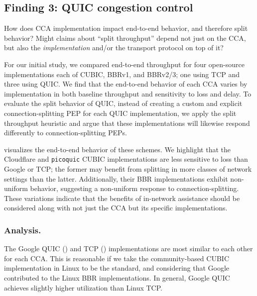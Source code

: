 \subsection{Finding 3: QUIC congestion control}
\label{sec:splitting:results:finding3}




How does CCA implementation impact end-to-end behavior, and therefore split
behavior? Might claims about ``split throughput'' depend not just on the CCA,
but also the \textit{implementation} and/or the transport protocol
on top of it?

For our initial study, we compared end-to-end throughput for four open-source
implementations each of CUBIC, BBRv1, and BBRv2/3; one using TCP and three
using QUIC. We find that the end-to-end behavior of each CCA varies by
implementation in both baseline throughput and sensitivity to loss and delay.
To evaluate the split behavior of QUIC, instead of creating a custom and
explicit connection-splitting PEP for each QUIC implementation, we apply the
split throughput heuristic and argue that these implementations
will likewise respond differently to connection-splitting PEPs.

 visualizes the end-to-end behavior of these schemes.
We highlight that the Cloudflare and \texttt{picoquic} CUBIC implementations are
less sensitive to loss than Google or TCP; the former may benefit from splitting
in more classes of network settings than the latter. Additionally, their BBR
implementations exhibit non-uniform behavior, suggesting a non-uniform response
to connection-splitting. These variations indicate that the benefits of
in-network assistance should be considered along with not just the CCA but its
specific implementations.

\subsubsection{Analysis.}

The Google QUIC ()
and TCP ()
implementations are most similar to each other for each CCA.
This is reasonable if we take the community-based CUBIC implementation in
Linux to be the standard, and considering that Google contributed to the Linux
BBR implementations. In general, Google QUIC achieves slightly higher
utilization than Linux TCP.

